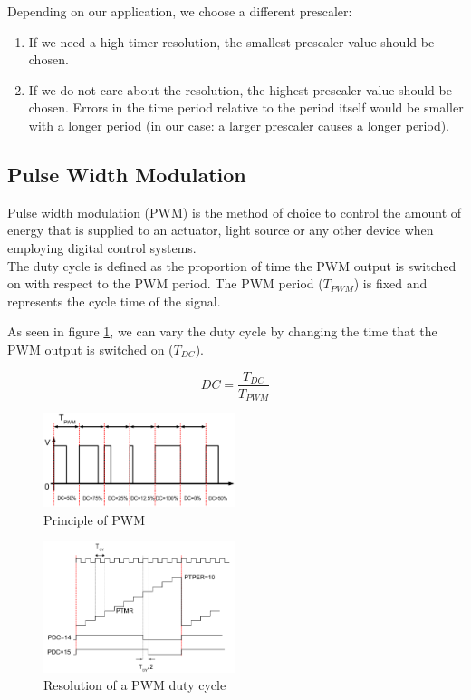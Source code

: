 Depending on our application, we choose a different prescaler:
\begin{enumerate}
    \item If we need a high timer resolution, the smallest prescaler value should be chosen. 
    \item If we do not care about the resolution, the highest prescaler value should be chosen. Errors in the time period relative to the period itself would be smaller with a longer period (in our case: a larger prescaler causes a longer period).
\end{enumerate}

\subsection{Pulse Width Modulation} 

\noindent
Pulse width modulation (PWM) is the method of choice to control the amount of energy that is supplied to an actuator, light source or any other device when employing digital control systems.\\
The duty cycle is defined as the proportion of time the PWM output is switched on with respect to the PWM period.
The PWM period ($T_{PWM}$) is fixed and represents the cycle time of the signal.

\noindent
As seen in figure \ref{fig:pwm_demo}, we can vary the duty cycle by changing the time that the PWM output is switched on ($T_{DC}$).

$$DC = \frac{T_{DC}}{T_{PWM}}$$

\begin{figure}[H]
    \centering
    \includegraphics[width=0.5\textwidth]{figures/software/pwm_demo.png}
    \caption{Principle of PWM \cite{alex}}
    \label{fig:pwm_demo}
\end{figure}

\begin{figure}[H]
    \centering
    \includegraphics[width=0.5\textwidth]{figures/software/pwm_choice.png}
     \caption{Resolution of a PWM duty cycle \cite{alex}}
    \label{fig:pwm_choice}
\end{figure}

